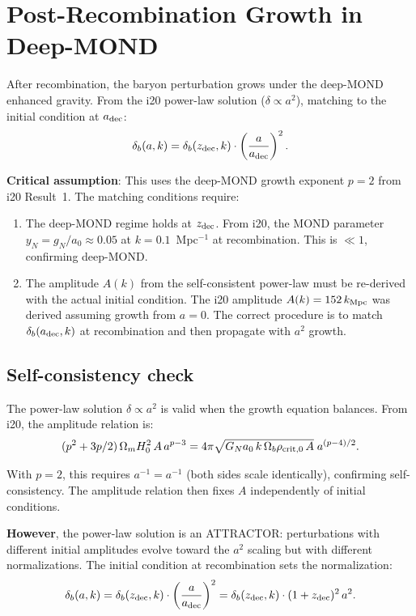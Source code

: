 \documentclass[11pt]{article}
\newcommand{\aM}{a_0}
\newcommand{\Ob}{\Omega_b}
\newcommand{\Om}{\Omega_m}
\begin{document}
\section{Post-Recombination Growth in Deep-MOND}

After recombination, the baryon perturbation grows under the deep-MOND
enhanced gravity. From the i20 power-law solution ($\delta \propto a^2$),
matching to the initial condition at $a_{\rm dec}$:
\begin{equation}
\delta_b(a, k) = \delta_b(z_{\rm dec}, k)\cdot
\left(\frac{a}{a_{\rm dec}}\right)^2.
\label{eq:growth}
\end{equation}

\textbf{Critical assumption}: This uses the deep-MOND growth exponent
$p = 2$ from i20 Result~1. The matching conditions require:

\begin{enumerate}
\item The deep-MOND regime holds at $z_{\rm dec}$. From i20, the MOND
  parameter $y_N = g_N/\aM \approx 0.05$ at $k = 0.1$~Mpc$^{-1}$
  at recombination. This is $\ll 1$, confirming deep-MOND.

\item The amplitude $A(k)$ from the self-consistent power-law must be
  re-derived with the actual initial condition. The i20 amplitude
  $A(k) = 152\,k_{\rm Mpc}$ was derived assuming growth from $a = 0$.
  The correct procedure is to match $\delta_b(a_{\rm dec}, k)$ at
  recombination and then propagate with $a^2$ growth.
\end{enumerate}

\subsection{Self-consistency check}

The power-law solution $\delta \propto a^2$ is valid when the growth
equation balances. From i20, the amplitude relation is:
\begin{equation}
(p^2 + 3p/2)\,\Om H_0^2\,A\,a^{p-3}
= 4\pi\sqrt{G_N\aM\,k\,\Ob\rho_{\rm crit,0}\,A}\;a^{(p-4)/2}.
\end{equation}

With $p = 2$, this requires $a^{-1} = a^{-1}$ (both sides scale
identically), confirming self-consistency. The amplitude relation
then fixes $A$ independently of initial conditions.

\textbf{However}, the power-law solution is an ATTRACTOR: perturbations
with different initial amplitudes evolve toward the $a^2$ scaling but
with different normalizations. The initial condition at recombination
sets the normalization:
\begin{equation}
\delta_b(a, k) = \delta_b(z_{\rm dec}, k)\cdot
\left(\frac{a}{a_{\rm dec}}\right)^2
= \delta_b(z_{\rm dec}, k)\cdot(1+z_{\rm dec})^2\,a^2.
\end{equation}
\end{document}
